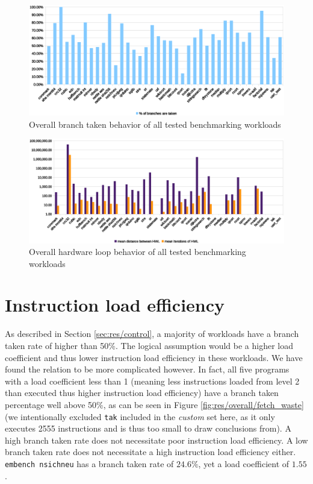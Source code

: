 \documentclass[../bachelor_paper.tex]{subfiles}
\begin{document}
\begin{figure}
    \centering
    \includegraphics[width=\textwidth]{img/graph/overall_branch_tk.eps}
    \caption{Overall branch taken behavior of all tested benchmarking workloads}
    \label{fig:res/overall/branch_tk}
\end{figure}

\begin{figure}
    \centering
    \includegraphics[width=\textwidth]{img/graph/overall_hwl.eps}
    \caption{Overall hardware loop behavior of all tested benchmarking workloads}
    \label{fig:res/overall/hwl}
\end{figure}

\section{Instruction load efficiency}
As described in Section \ref{sec:res/control}, a majority of workloads have a branch taken rate of higher than 50\%. The logical assumption would be a higher load coefficient and thus lower instruction load efficiency in these workloads. We have found the relation to be more complicated however. In fact, all five programs with a load coefficient less than 1 (meaning less instructions loaded from level 2 than executed thus higher instruction load efficiency) have a branch taken percentage well above 50\%, as can be seen in Figure \ref{fig:res/overall/fetch_waste} (we intentionally excluded \texttt{tak} included in the \emph{custom} set here, as it only executes 2555 instructions and is thus too small to draw conclusions from). A high branch taken rate does not necessitate poor instruction load efficiency. A low branch taken rate does not necessitate a high instruction load efficiency either. \texttt{embench nsichneu} has a branch taken rate of $24.6\%$, yet a load coefficient of $1.55$.
\end{document}
